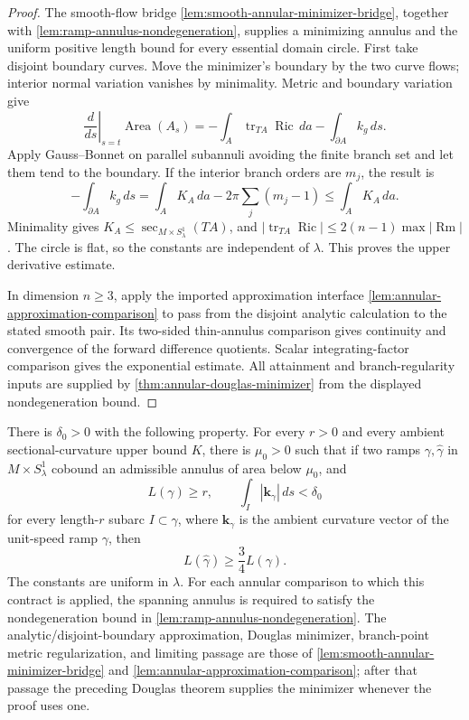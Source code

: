\begin{proof}
 The smooth-flow bridge \ref{lem:smooth-annular-minimizer-bridge}, together with
\ref{lem:ramp-annulus-nondegeneration}, supplies a minimizing annulus and the
uniform positive length bound for every essential domain circle.  First take
disjoint boundary curves.  Move the minimizer's boundary by the two curve
flows; interior normal variation vanishes by minimality.  Metric and boundary
variation give
\[
 \left.\frac d{ds}\right|_{s=t}\operatorname{Area}(A_s)
 =-\int_A\operatorname{tr}_{TA}\operatorname{Ric}\,da
   -\int_{\partial A}k_g\,ds.
\]
Apply Gauss--Bonnet on parallel subannuli avoiding the finite branch set and
let them tend to the boundary.  If the interior branch orders are $m_j$, the
result is
\[
 -\int_{\partial A}k_g\,ds
 =\int_AK_A\,da-2\pi\sum_j(m_j-1)
 \le\int_AK_A\,da.
\]
Minimality gives $K_A\le\sec_{M\times S^1_\lambda}(TA)$, and
$|\operatorname{tr}_{TA}\operatorname{Ric}|\le2(n-1)\max|\operatorname{Rm}|$.  The circle is flat, so
the constants are independent of $\lambda$.  This proves the upper
derivative estimate.

In dimension $n\ge3$, apply the imported approximation interface
\ref{lem:annular-approximation-comparison} to pass from the disjoint analytic
calculation to the stated smooth pair.  Its two-sided thin-annulus comparison
gives continuity and convergence of the forward difference quotients.  Scalar
integrating-factor comparison gives the exponential estimate.  All attainment
and branch-regularity inputs are supplied by
\ref{thm:annular-douglas-minimizer} from the displayed nondegeneration bound.
\end{proof}

\begin{theorem}
\label{thm:small-annulus-length-transfer}
\notready
There is $\delta_0>0$ with the following property.  For every $r>0$ and every
ambient sectional-curvature upper bound $K$, there is $\mu_0>0$ such that if
two ramps $\gamma,\widehat\gamma$ in
$M\times S^1_\lambda$ cobound an admissible annulus of area below $\mu_0$, and
\[
 L(\gamma)\ge r,
 \qquad
 \int_I|\mathbf k_\gamma|\,ds<\delta_0
\]
for every length-$r$ subarc $I\subset\gamma$, where
$\mathbf k_\gamma$ is the ambient curvature vector of the unit-speed ramp
$\gamma$, then
\[
 L(\widehat\gamma)\ge\frac34L(\gamma).
\]
The constants are uniform in $\lambda$.  For each annular comparison to
which this contract is applied, the spanning annulus is required to satisfy
the nondegeneration bound in
\ref{lem:ramp-annulus-nondegeneration}.  The analytic/disjoint-boundary
approximation, Douglas minimizer, branch-point metric regularization, and
limiting passage are those of
\ref{lem:smooth-annular-minimizer-bridge} and
\ref{lem:annular-approximation-comparison}; after that passage the preceding
Douglas theorem supplies the minimizer whenever the proof uses one.
\end{theorem}

